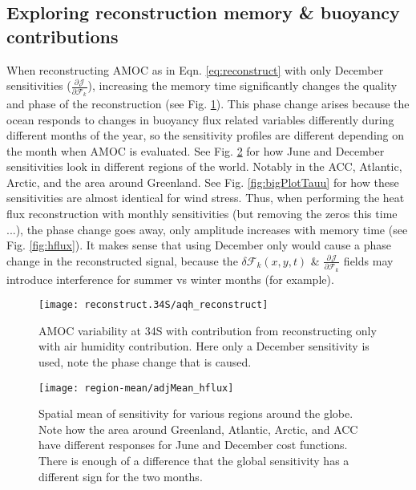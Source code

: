 \documentclass[a4paper,11pt]{article}
\newcommand{\pderiv}[3][]{%
  \ensuremath{\frac{\partial^{#1} {#2}}{\partial {#3}^{#1}}}}
\begin{document}
  \subsection{Exploring reconstruction memory \& buoyancy contributions}

  When reconstructing AMOC as in Eqn. \ref{eq:reconstruct} with only December sensitivities ($\pderiv{\mathcal{J}}{\mathcal{F}_k}$), increasing the memory time significantly changes the quality and phase of the reconstruction (see Fig. \ref{fig:phaseChangeAqh}). This phase change arises because the ocean responds to changes in buoyancy flux related variables differently during different months of the year, so the sensitivity profiles are different depending on the month when AMOC is evaluated. See Fig. \ref{fig:bigPlotHflux} for how June and December sensitivities look in different regions of the world. Notably in the ACC, Atlantic, Arctic, and the area around Greenland. See Fig. \ref{fig:bigPlotTauu} for how these sensitivities are almost identical for wind stress. Thus, when performing the heat flux reconstruction with monthly sensitivities (but removing the zeros this time ...), the phase change goes away, only amplitude increases with memory time (see Fig. \ref{fig:hflux}). It makes sense that using December only would cause a phase change in the reconstructed signal, because the $\delta\mathcal{F}_k(x,y,t)$ \& $\pderiv{\mathcal{J}}{\mathcal{F}_k}$ fields may introduce interference for summer vs winter months (for example).

  
   \begin{figure}
    \centering
    \texttt{[image: reconstruct.34S/aqh\_reconstruct]}
    \caption{AMOC variability at 34S with contribution from reconstructing only with air humidity contribution. Here only a December sensitivity is used, note the phase change that is caused.} 
    \label{fig:phaseChangeAqh}
   \end{figure}

   \begin{figure}
    \centering
    \texttt{[image: region-mean/adjMean\_hflux]}
    \caption{Spatial mean of sensitivity for various regions around the globe. Note how the area around Greenland, Atlantic, Arctic, and ACC have different responses for June and December cost functions. There is enough of a difference that the global sensitivity has a different sign for the two months.}
    \label{fig:bigPlotHflux}
   \end{figure}
\end{document}
